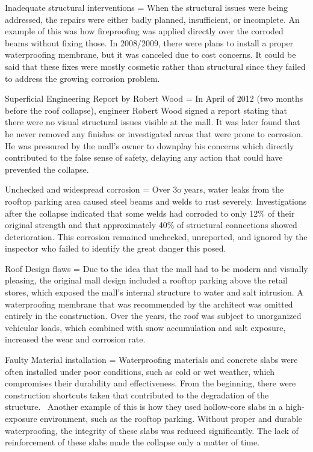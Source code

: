 \documentclass[12pt]{article}
\begin{document}
 

 

 
Inadequate structural interventions = When the structural issues were being addressed, the repairs were either badly planned, insufficient, or incomplete. An example of this was how fireproofing was applied directly over the corroded beams without fixing those. In 2008/2009, there were plans to install a proper waterproofing membrane, but it was canceled due to cost concerns. It could be said that these fixes were mostly cosmetic rather than structural since they failed to address the growing corrosion problem. 

 

 
Superficial Engineering Report by Robert Wood = In April of 2012 (two months before the roof collapse), engineer Robert Wood signed a report stating that there were no visual structural issues visible at the mall. It was later found that he never removed any finishes or investigated areas that were prone to corrosion. He was pressured by the mall’s owner to downplay his concerns which directly contributed to the false sense of safety, delaying any action that could have prevented the collapse. 

 

 
Unchecked and widespread corrosion = Over 3o years, water leaks from the rooftop parking area caused steel beams and welds to rust severely. Investigations after the collapse indicated that some welds had corroded to only 12\% of their original strength and that approximately 40\% of structural connections showed deterioration. This corrosion remained unchecked, unreported, and ignored by the inspector who failed to identify the great danger this posed. 

 

 
Roof Design flaws = Due to the idea that the mall had to be modern and visually pleasing, the original mall design included a rooftop parking above the retail stores, which exposed the mall's internal structure to water and salt intrusion. A waterproofing membrane that was recommended by the architect was omitted entirely in the construction. Over the years, the roof was subject to unorganized vehicular loads, which combined with snow accumulation and salt exposure, increased the wear and corrosion rate.

 

 
Faulty Material installation = Waterproofing materials and concrete slabs were often installed under poor conditions, such as cold or wet weather, which compromises their durability and effectiveness. From the beginning, there were construction shortcuts taken that contributed to the degradation of the structure.  Another example of this is how they used hollow-core slabs in a high-exposure environment, such as the rooftop parking. Without proper and durable waterproofing, the integrity of these slabs was reduced significantly. The lack of reinforcement of these slabs made the collapse only a matter of time. 
\end{document}
